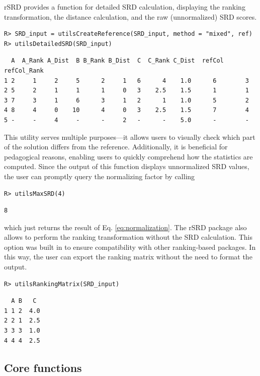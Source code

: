 \smallskip

rSRD provides a function for detailed SRD calculation, displaying the ranking transformation, the distance calculation, and the raw (unnormalized) SRD scores.

\begin{verbatim}
R> SRD_input = utilsCreateReference(SRD_input, method = "mixed", ref)
R> utilsDetailedSRD(SRD_input)
\end{verbatim}
\begin{verbatim}
  A  A_Rank A_Dist  B B_Rank B_Dist  C  C_Rank C_Dist  refCol refCol_Rank
1 2     1     2     5      2     1   6      4    1.0      6        3
2 5     2     1     1      1     0   3    2.5    1.5      1        1
3 7     3     1     6      3     1   2      1    1.0      5        2
4 8     4     0    10      4     0   3    2.5    1.5      7        4
5 -     -     4     -      -     2   -      -    5.0      -        -
\end{verbatim}

This utility serves multiple purposes---it allows users to visually check which part of the solution differs from the reference. Additionally, it is beneficial for pedagogical reasons, enabling users to quickly comprehend how the statistics are computed. Since the output of this function displays unnormalized SRD values, the user can promptly query the normalizing factor by calling

\begin{verbatim}
R> utilsMaxSRD(4)
\end{verbatim}
\begin{verbatim}
8
\end{verbatim}

which just returns the result of  Eq. \ref{eq:normalization}.
The rSRD package also allows to perform the ranking transformation without the SRD calculation. This option was built in to ensure compatibility with other ranking-based packages. In this way, the user can export the ranking matrix without the need to format the output.

\begin{verbatim}
R> utilsRankingMatrix(SRD_input)
\end{verbatim}
\begin{verbatim}
  A B   C
1 1 2  4.0
2 2 1  2.5
3 3 3  1.0
4 4 4  2.5
\end{verbatim}

\subsection{Core functions}

